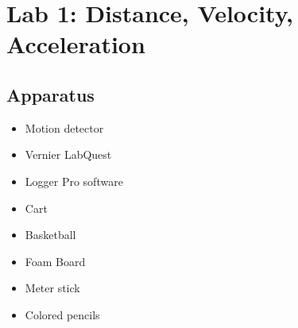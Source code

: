 

\usepackage{graphicx}
\graphicspath{ {./lab01images/} }


\renewcommand\assignment{Lab 1: Distance, Velocity, Acceleration, 1/31/2023, Partners: Maite Valentin-Lugo, Seth Waln}

    \section*{Lab 1: Distance, Velocity, Acceleration}

    \subsection*{Apparatus}

    \begin{itemize}
        \item Motion detector
        \item Vernier LabQuest
        \item Logger Pro software
        \item Cart
        \item Basketball
        \item Foam Board
        \item Meter stick
        \item Colored pencils
    \end{itemize}

